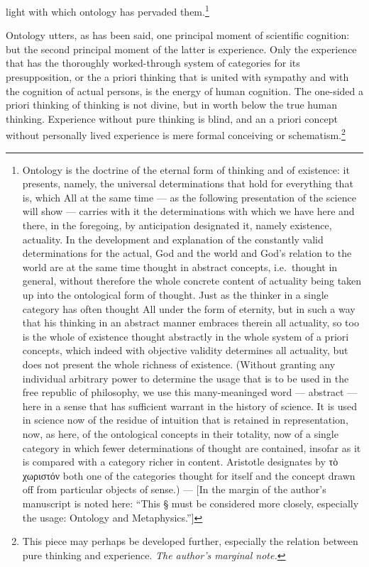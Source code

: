 \documentclass[12pt]{article}
\newcommand{\opage}[1]{\marginnote{\footnotesize\textit{[#1]}}}
\begin{document}
light with which ontology has pervaded them.\footnote{Ontology is the doctrine of
the eternal form of thinking and of existence: it presents, namely, the universal
determinations that hold for everything that is, which All at the same time --- as
the following presentation of the science will show --- carries with it the
determinations with which we have here and there, in the foregoing, by
anticipation designated it, namely existence, actuality. In the development and
explanation of the constantly valid determinations for the actual, God and the
world and God's relation to the world are at the same time thought in abstract
concepts, i.e.\ thought in general, without therefore the whole concrete content
of actuality being taken up into the ontological form of thought. Just as the
thinker in a single category has often thought All under the form of eternity, but
in such a way that his thinking in an abstract manner embraces therein all
actuality, so too is the whole of existence thought abstractly in the whole system
of a priori concepts, which indeed with objective validity determines all
actuality, but does not present the whole richness of existence. (Without granting
any individual arbitrary power to determine the usage that is to be used in the
free republic of philosophy, we use this many-meaninged word --- abstract --- here
in a sense that has sufficient warrant in the history of science. It is used in
science now of the residue of intuition that is retained in representation, now,
as here, of the ontological concepts in their totality, now of a single category
in which fewer determinations of thought are contained, insofar as it is compared
with a category richer in content. Aristotle designates by τὸ χωριστόν both one of
the categories thought for itself and the concept drawn off from particular
objects of sense.) --- [In the margin of the author's manuscript is noted here:
``This § must be considered more closely, especially the usage: Ontology and
Metaphysics.'']}

Ontology utters, as has been said, one principal moment of \opage{203}scientific
cognition: but the second principal moment of the latter is experience. Only the
experience that has the thoroughly worked-through system of categories for its
presupposition, or the a priori thinking that is united with sympathy and with the
cognition of actual persons, is the energy of human cognition. The one-sided a
priori thinking of thinking is not divine, but in worth below the true human
thinking. Experience without pure thinking is blind, and an a priori concept
without personally lived experience is mere formal conceiving or
schematism.\footnote{This piece may perhaps be developed further, especially the
relation between pure thinking and experience. \emph{The author's marginal note.}}
\end{document}
